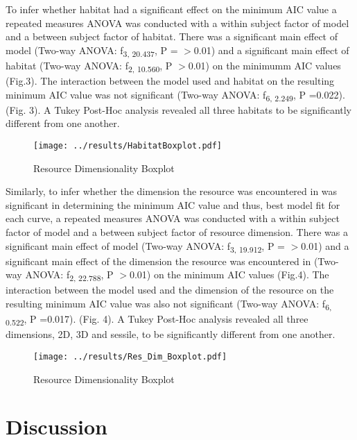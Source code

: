 \documentclass[11pt]{article}
\begin{document}
To infer whether habitat had a significant effect on the minimum AIC value a repeated measures ANOVA was conducted with a within subject factor of model and a between subject factor of habitat. There was a significant main effect of model (Two-way ANOVA: f\textsubscript{3, 20.437}, P = $>$0.01) and a significant main effect of habitat (Two-way ANOVA: f\textsubscript{2, 10.560}, P $>$0.01) on the minimumm AIC values (Fig.3). The interaction between the model used and habitat on the resulting minimum AIC value was not significant (Two-way ANOVA: f\textsubscript{6, 2.249}, P =0.022).  (Fig. 3). \newline A Tukey Post-Hoc analysis revealed all three habitats to be significantly different from one another. 

\begin{figure}[h!]
	\centering 
	\texttt{[image: ../results/HabitatBoxplot.pdf]}
	\caption{Resource Dimensionality Boxplot}
	\label{Habitat Boxplot of model types}
\end{figure}

Similarly, to infer whether the dimension the resource was encountered in was significant in determining the minimum AIC value and thus, best model fit for each curve, a repeated measures ANOVA was conducted with a within subject factor of model and a between subject factor of resource dimension. There was a significant main effect of model (Two-way ANOVA: f\textsubscript{3, 19.912}, P = $>$0.01) and a significant main effect of the dimension the resource was encountered in (Two-way ANOVA: f\textsubscript{2, 22.788}, P $>$0.01) on the minimum AIC values (Fig.4). The interaction between the model used and the dimension of the resource on the resulting minimum AIC value was also not significant (Two-way ANOVA: f\textsubscript{6, 0.522}, P =0.017).  (Fig. 4). \newline A Tukey Post-Hoc analysis revealed all three dimensions, 2D, 3D and sessile,  to be significantly different from one another. 


\begin{figure}[h!]
	\centering 
	\texttt{[image: ../results/Res\_Dim\_Boxplot.pdf]}
	\caption{Resource Dimensionality Boxplot}
	\label{Resource Dimensionality Boxplot of model types}
\end{figure}
\newpage


	\section{Discussion}
\noindent
\end{document}
